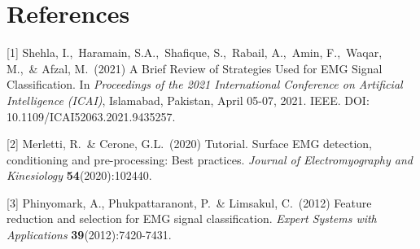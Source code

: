 
\section*{References}




{
\small


[1] Shehla, I.,\  Haramain, S.A.,\ Shafique, S.,\  Rabail, A.,\  Amin, F.,\  Waqar, M.,\  \& Afzal, M.\ (2021) 
A Brief Review of Strategies Used for EMG Signal Classification.  
In \textit{Proceedings of the 2021 International Conference on Artificial Intelligence (ICAI)},  
Islamabad, Pakistan, April 05-07, 2021. IEEE.  
DOI: 10.1109/ICAI52063.2021.9435257.  


[2] Merletti, R.\ \& Cerone, G.L.\
(2020) Tutorial. Surface EMG detection, conditioning and pre-processing: Best 
practices.
{\it Journal of Electromyography and Kinesiology} {\bf 54}(2020):102440.


[3] Phinyomark, A., Phukpattaranont, P.\ \& Limsakul, C.\
 (2012) Feature reduction and selection for EMG signal classification.
 {\it Expert Systems with Applications} {\bf 39}(2012):7420-7431.
}


